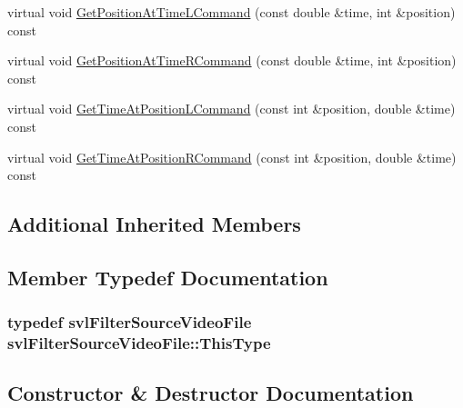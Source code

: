 \begin{DoxyCompactItemize}
\item 
virtual void \hyperlink{classsvl_filter_source_video_file_aeb8abbf0567077cc07192673abffff85}{Get\+Position\+At\+Time\+L\+Command} (const double \&time, int \&position) const 
\item 
virtual void \hyperlink{classsvl_filter_source_video_file_a5ae65a28b1825cd1fb7e85352e42ae11}{Get\+Position\+At\+Time\+R\+Command} (const double \&time, int \&position) const 
\item 
virtual void \hyperlink{classsvl_filter_source_video_file_ad48693c74ac3385a992b8d70c402328e}{Get\+Time\+At\+Position\+L\+Command} (const int \&position, double \&time) const 
\item 
virtual void \hyperlink{classsvl_filter_source_video_file_a96d2938f3efb2c427021b17bad5b8976}{Get\+Time\+At\+Position\+R\+Command} (const int \&position, double \&time) const 
\end{DoxyCompactItemize}
\subsection*{Additional Inherited Members}


\subsection{Member Typedef Documentation}
\hypertarget{classsvl_filter_source_video_file_a64bb04cd76d1088e40860d6f0d2e1897}{}
\subsubsection[{This\+Type}]{\setlength{\rightskip}{0pt plus 5cm}typedef {\bf svl\+Filter\+Source\+Video\+File} {\bf svl\+Filter\+Source\+Video\+File\+::\+This\+Type}\hspace{0.3cm}{\ttfamily [protected]}}\label{classsvl_filter_source_video_file_a64bb04cd76d1088e40860d6f0d2e1897}


\subsection{Constructor \& Destructor Documentation}
\hypertarget{classsvl_filter_source_video_file_a4ae5b43e23aeca2412c8e779bddd35c6}{}
